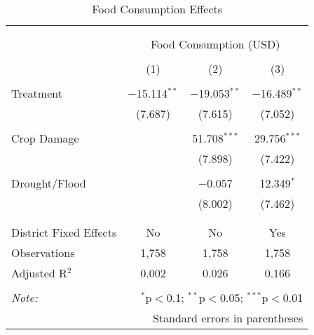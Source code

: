 
\begin{table}[!htbp] \centering 
  \caption{Food Consumption Effects} 
  \label{} 
\begin{tabular}{@{\extracolsep{5pt}}lccc} 
\\[-1.8ex]\hline 
\hline \\[-1.8ex] 
\\[-1.8ex] & \multicolumn{3}{c}{Food Consumption (USD)} \\ 
\\[-1.8ex] & (1) & (2) & (3)\\ 
\hline \\[-1.8ex] 
 Treatment & $-$15.114$^{**}$ & $-$19.053$^{**}$ & $-$16.489$^{**}$ \\ 
  & (7.687) & (7.615) & (7.052) \\ 
  & & & \\ 
 Crop Damage &  & 51.708$^{***}$ & 29.756$^{***}$ \\ 
  &  & (7.898) & (7.422) \\ 
  & & & \\ 
 Drought/Flood &  & $-$0.057 & 12.349$^{*}$ \\ 
  &  & (8.002) & (7.462) \\ 
  & & & \\ 
\hline \\[-1.8ex] 
District Fixed Effects & No & No & Yes \\ 
Observations & 1,758 & 1,758 & 1,758 \\ 
Adjusted R$^{2}$ & 0.002 & 0.026 & 0.166 \\ 
\hline 
\hline \\[-1.8ex] 
\textit{Note:}  & \multicolumn{3}{r}{$^{*}$p$<$0.1; $^{**}$p$<$0.05; $^{***}$p$<$0.01} \\ 
 & \multicolumn{3}{r}{Standard errors in parentheses} \\ 
\end{tabular} 
\end{table} 

